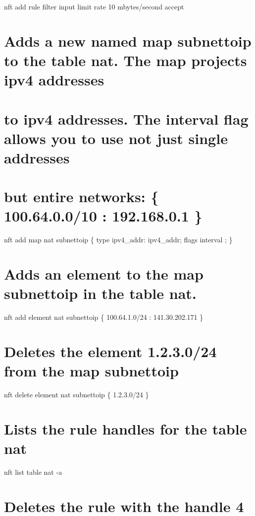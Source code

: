 \begin{itemize}
  nft add rule filter input limit rate 10 mbytes/second accept

  \section{Adds a new named map subnettoip to the table nat. The map
  projects ipv4
  addresses}\label{adds-a-new-named-map-subnettoip-to-the-table-nat.-the-map-projects-ipv4-addresses}

  \section{to ipv4 addresses. The interval flag allows you to use not
  just single
  addresses}\label{to-ipv4-addresses.-the-interval-flag-allows-you-to-use-not-just-single-addresses}

  \section{but entire networks: \{ 100.64.0.0/10 : 192.168.0.1
  \}}\label{but-entire-networks-100.64.0.010-192.168.0.1}

  nft add map nat subnettoip \{ type ipv4\_addr: ipv4\_addr; flags
  interval ; \}

  \section{Adds an element to the map subnettoip in the table
  nat.}\label{adds-an-element-to-the-map-subnettoip-in-the-table-nat.}

  nft add element nat subnettoip \{ 100.64.1.0/24 : 141.30.202.171 \}

  \section{Deletes the element 1.2.3.0/24 from the map
  subnettoip}\label{deletes-the-element-1.2.3.024-from-the-map-subnettoip}

  nft delete element nat subnettoip \{ 1.2.3.0/24 \}

  \section{Lists the rule handles for the table
  nat}\label{lists-the-rule-handles-for-the-table-nat}

  nft list table nat -a

  \section{Deletes the rule with the handle
  4}\label{deletes-the-rule-with-the-handle-4}


\end{itemize}
